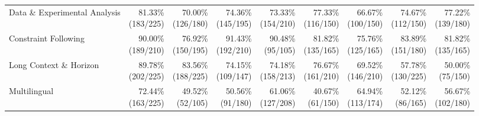 \documentclass{article} %
\begin{document}
\begin{table}[htbp]
{\begin{tabular}{@{}lrrrrrrrr@{}}
			Data \& Experimental Analysis & \shortstack{81.33\%\\(183/225)} & \shortstack{70.00\%\\(126/180)} & \shortstack{74.36\%\\(145/195)} & \shortstack{73.33\%\\(154/210)} & \shortstack{77.33\%\\(116/150)} & \shortstack{66.67\%\\(100/150)} & \shortstack{74.67\%\\(112/150)} & \shortstack{77.22\%\\(139/180)} \\
			Constraint Following & \shortstack{90.00\%\\(189/210)} & \shortstack{76.92\%\\(150/195)} & \shortstack{91.43\%\\(192/210)} & \shortstack{90.48\%\\(95/105)} & \shortstack{81.82\%\\(135/165)} & \shortstack{75.76\%\\(125/165)} & \shortstack{83.89\%\\(151/180)} & \shortstack{81.82\%\\(135/165)} \\
			Long Context \& Horizon & \shortstack{89.78\%\\(202/225)} & \shortstack{83.56\%\\(188/225)} & \shortstack{74.15\%\\(109/147)} & \shortstack{74.18\%\\(158/213)} & \shortstack{76.67\%\\(161/210)} & \shortstack{69.52\%\\(146/210)} & \shortstack{57.78\%\\(130/225)} & \shortstack{50.00\%\\(75/150)} \\
			Multilingual & \shortstack{72.44\%\\(163/225)} & \shortstack{49.52\%\\(52/105)} & \shortstack{50.56\%\\(91/180)} & \shortstack{61.06\%\\(127/208)} & \shortstack{40.67\%\\(61/150)} & \shortstack{64.94\%\\(113/174)} & \shortstack{52.12\%\\(86/165)} & \shortstack{56.67\%\\(102/180)} \\

\end{tabular}}
\end{table}
\end{document}
